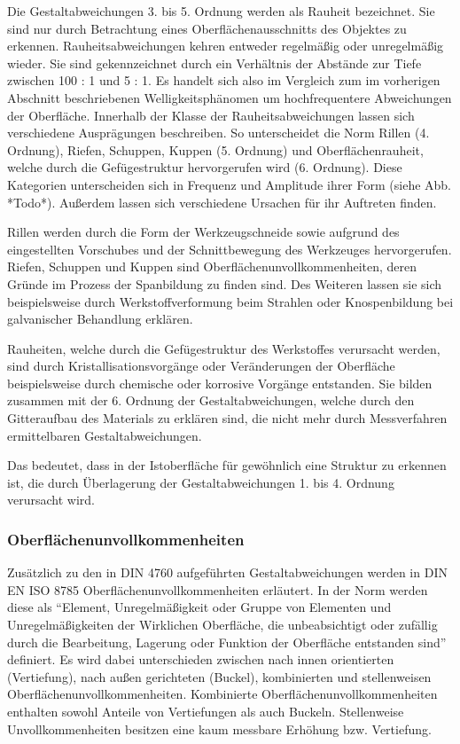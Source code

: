 Die Gestaltabweichungen 3. bis 5. Ordnung werden als Rauheit bezeichnet. Sie sind nur durch Betrachtung eines Oberflächenausschnitts des Objektes zu erkennen. Rauheitsabweichungen kehren entweder regelmäßig oder unregelmäßig wieder. Sie sind gekennzeichnet durch ein Verhältnis der Abstände zur Tiefe zwischen 100 : 1 und 5 : 1. Es handelt sich also im Vergleich zum im vorherigen Abschnitt beschriebenen Welligkeitsphänomen um hochfrequentere Abweichungen der Oberfläche. 
Innerhalb der Klasse der Rauheitsabweichungen lassen sich verschiedene Ausprägungen beschreiben. So unterscheidet die Norm Rillen (4. Ordnung), Riefen, Schuppen, Kuppen (5. Ordnung) und Oberflächenrauheit, welche durch die Gefügestruktur hervorgerufen wird (6. Ordnung).
Diese Kategorien unterscheiden sich in Frequenz und Amplitude ihrer Form (siehe Abb. *Todo*). Außerdem lassen sich verschiedene Ursachen für ihr Auftreten finden. 

Rillen werden durch die Form der Werkzeugschneide sowie aufgrund des eingestellten Vorschubes und der Schnittbewegung des Werkzeuges hervorgerufen.
Riefen, Schuppen und Kuppen sind Oberflächenunvollkommenheiten, deren Gründe im Prozess der Spanbildung zu finden sind. Des Weiteren lassen sie sich beispielsweise durch Werkstoffverformung beim Strahlen oder Knospenbildung bei galvanischer Behandlung erklären. 

Rauheiten, welche durch die Gefügestruktur des Werkstoffes verursacht werden, sind durch Kristallisationsvorgänge oder Veränderungen der Oberfläche beispielsweise durch chemische oder korrosive Vorgänge entstanden. Sie bilden zusammen mit der 6. Ordnung der Gestaltabweichungen, welche durch den Gitteraufbau des Materials zu erklären sind, die nicht mehr durch Messverfahren ermittelbaren Gestaltabweichungen. 

Das bedeutet, dass in der Istoberfläche für gewöhnlich eine Struktur zu erkennen ist, die durch Überlagerung der Gestaltabweichungen 1. bis 4. Ordnung verursacht wird. 

\subsubsection{Oberflächenunvollkommenheiten}

Zusätzlich zu den in DIN 4760 aufgeführten Gestaltabweichungen werden in DIN EN ISO 8785 Oberflächenunvollkommenheiten erläutert. In der Norm werden diese als "`Element, Unregelmäßigkeit oder Gruppe von Elementen und Unregelmäßigkeiten der Wirklichen Oberfläche, die unbeabsichtigt oder zufällig durch die Bearbeitung, Lagerung oder Funktion der Oberfläche entstanden sind"' definiert. Es wird dabei unterschieden zwischen nach innen orientierten (Vertiefung), nach außen gerichteten (Buckel), kombinierten und stellenweisen Oberflächenunvollkommenheiten. Kombinierte Oberflächenunvollkommenheiten enthalten sowohl Anteile von Vertiefungen als auch Buckeln. Stellenweise Unvollkommenheiten besitzen eine kaum messbare Erhöhung bzw. Vertiefung. 

